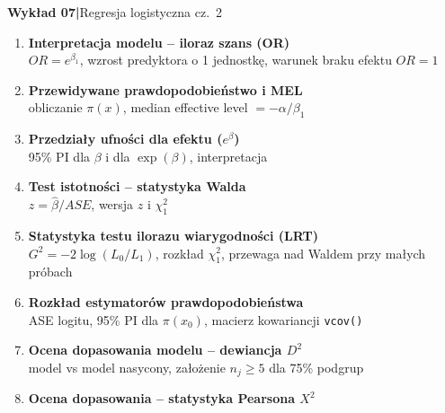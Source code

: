 \documentclass[a4paper,11pt]{article}
\begin{document}
\vspace{1em}
 
\begin{mdframed}[
  backgroundcolor=lightblue,
  linecolor=borderblue,
  linewidth=0.8pt,
  innerleftmargin=10pt,
  innerrightmargin=10pt,
  innertopmargin=6pt,
  innerbottommargin=6pt,
  roundcorner=4pt
]
  \textbf{\color{accentblue}Wykład 07\quad|\quad}{\color{darkgray}Regresja logistyczna cz.\ 2}
\end{mdframed}
 
\vspace{0.4em}
\begin{enumerate}[label=\textbf{\arabic*.}, leftmargin=1.8em, itemsep=3pt, topsep=2pt]
  \item \textbf{Interpretacja modelu -- iloraz szans (OR)}\\
        {\small\color{medgray}$OR = e^{\beta_1}$, wzrost predyktora o 1 jednostkę, warunek braku efektu $OR=1$}
  \item \textbf{Przewidywane prawdopodobieństwo i MEL}\\
        {\small\color{medgray}obliczanie $\pi(x)$, median effective level $= -\alpha/\beta_1$}
  \item \textbf{Przedziały ufności dla efektu ($e^\beta$)}\\
        {\small\color{medgray}95\% PI dla $\beta$ i dla $\exp(\beta)$, interpretacja}
  \item \textbf{Test istotności -- statystyka Walda}\\
        {\small\color{medgray}$z = \hat\beta / ASE$, wersja $z$ i $\chi^2_1$}
  \item \textbf{Statystyka testu ilorazu wiarygodności (LRT)}\\
        {\small\color{medgray}$G^2 = -2\log(L_0/L_1)$, rozkład $\chi^2_1$, przewaga nad Waldem przy małych próbach}
  \item \textbf{Rozkład estymatorów prawdopodobieństwa}\\
        {\small\color{medgray}ASE logitu, 95\% PI dla $\pi(x_0)$, macierz kowariancji \texttt{vcov()}}
  \item \textbf{Ocena dopasowania modelu -- dewiancja $D^2$}\\
        {\small\color{medgray}model vs model nasycony, założenie $n_j \geq 5$ dla 75\% podgrup}
  \item \textbf{Ocena dopasowania -- statystyka Pearsona $X^2$}\\

\end{enumerate}
\end{document}
